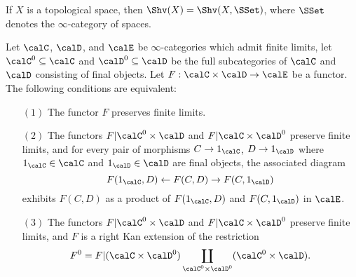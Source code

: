 \begin{remark}
If $X$ is a topological space, then $\Shv(X) = \Shv(X, \SSet)$, where $\SSet$ denotes the $\infty$-category of spaces.
\end{remark}

\begin{lemma}\label{strippus}
Let $\calC$, $\calD$, and $\calE$ be $\infty$-categories which admit finite limits, 
let $\calC^{0} \subseteq \calC$ and $\calD^{0} \subseteq \calD$ be the full subcategories of $\calC$ and $\calD$ consisting of final objects. Let $F: \calC \times \calD \rightarrow \calE$ be a functor.
The following conditions are equivalent:

\begin{itemize}
\item[$(1)$] The functor $F$ preserves finite limits.

\item[$(2)$] 
The functors $F | \calC^{0} \times \calD$ and
$F| \calC \times \calD^{0}$ preserve finite limits, and for every pair of morphisms
$C \rightarrow 1_{\calC}$, $D \rightarrow 1_{\calD}$ where $1_{\calC} \in \calC$
and $1_{\calD} \in \calD$ are final objects, the associated diagram
$$ F(1_{\calC},D) \leftarrow F(C,D) \rightarrow F(C, 1_{\calD})$$ exhibits
$F(C,D)$ as a product of $F(1_{\calC},D)$ and $F(C,1_{\calD})$ in $\calE$.

\item[$(3)$] The functors $F | \calC^{0} \times \calD$ and
$F| \calC \times \calD^{0}$ preserve finite limits, and $F$ is a right
Kan extension of the restriction
$$F^0=  F | (\calC \times \calD^{0}) \coprod_{ \calC^{0} \times \calD^{0} } (\calC^{0} \times \calD).$$
\end{itemize}
\end{lemma}

